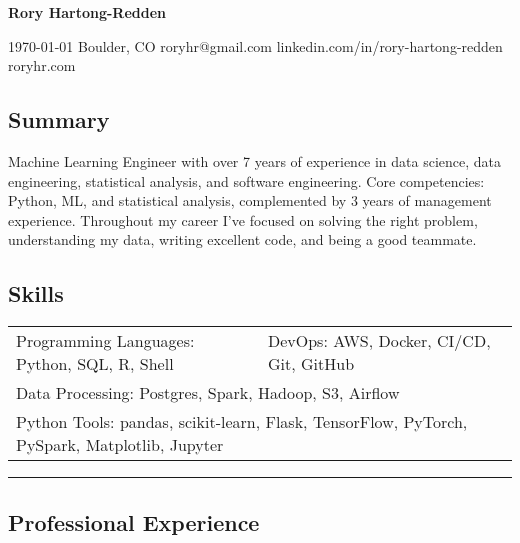 \documentclass[10pt,letterpaper]{article}
\newenvironment{indentsection}[1]
{\begin{list}{}%
	{\setlength{\leftmargin}{#1}}
	\item[]%
}
{\end{list}}
\begin{document}
{\raggedright \LARGE \bf Rory Hartong-Redden}

{\raggedleft 
\today \/ \textbar
\/ Boulder, CO \textbar
\/ roryhr@gmail.com \textbar
\/ linkedin.com/in/rory-hartong-redden \textbar
\/ roryhr.com
\\
}


\subsection*{Summary}
\begin{centering}
Machine Learning Engineer with over 7 years of experience in data science, data engineering, statistical analysis, and software engineering. Core competencies: Python, ML, and statistical analysis, complemented by 3 years of management experience. Throughout my career I've focused on solving the right problem, understanding my data, writing excellent code, and being a good teammate.
\end{centering}

\subsection*{Skills}
\begin{indentsection}{\parindent}
\begin{tabular}{p{0.5\linewidth}   p{0.5\linewidth}} 
    Programming Languages: Python, SQL, R, Shell
    & DevOps: AWS, Docker, CI/CD, Git, GitHub \\

    \multicolumn{2}{l}{Data Processing: Postgres, Spark, Hadoop, S3, Airflow} \\
    \multicolumn{2}{l}{
        Python Tools: pandas, scikit-learn, Flask, TensorFlow, PyTorch, PySpark, Matplotlib, Jupyter
        } \\
\end{tabular}
\end{indentsection}

\hrule
\subsection*{Professional Experience}
\end{document}
